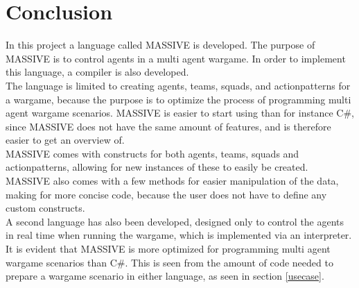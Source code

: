 \chapter{Conclusion}

In this project a language called MASSIVE is developed. The purpose of MASSIVE is to control agents in a multi agent wargame. In order to implement this language, a compiler is also developed.\\ \indent
The language is limited to creating agents, teams, squads, and actionpatterns for a wargame, because the purpose is to optimize the process of programming multi agent wargame scenarios. MASSIVE is easier to start using than for instance C\#, since MASSIVE does not have the same amount of features, and is therefore easier to get an overview of.\\ \indent
MASSIVE comes with constructs for both agents, teams, squads and actionpatterns, allowing for new instances of these to easily be created. MASSIVE also comes with a few methods for easier manipulation of the data, making for more concise code, because the user does not have to define any custom constructs.\\ \indent
A second language has also been developed, designed only to control the agents in real time when running the wargame, which is implemented via an interpreter.\\ \indent
It is evident that MASSIVE is more optimized for programming multi agent wargame scenarios than C\#. This is seen from the amount of code needed to prepare a wargame scenario in either language, as seen in section \ref{usecase}.